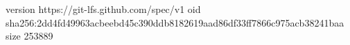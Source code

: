 version https://git-lfs.github.com/spec/v1
oid sha256:2dd4fd49963acbeebd45c390ddb8182619aad86df33ff7866c975acb38241baa
size 253889
